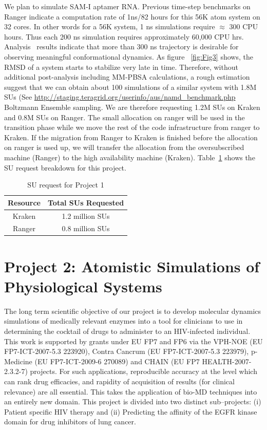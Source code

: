 \documentclass[a4paper,11pt]{article}
\newcommand{\up}{\vspace*{-1em}}
\begin{document}
We plan to simulate SAM-I aptamer RNA. Previous time-step benchmarks on Ranger indicate a computation rate of 1ns/82 hours for this 56K atom system on 32 cores. In other words for a 56K system, 1 ns simulations require $\approx$ 300 CPU hours.  Thus each 200 ns simulation requires approximately 60,000 CPU hrs.  Analysis~\cite{SAM-I-NAR2009} results indicate that more than 300 ns trajectory is desirable for observing meaningful conformational dynamics. As figure ~\ref{fig:Fig3} shows, the RMSD of a system starts to stabilize very late in time. Therefore, without additional post-analysis including MM-PBSA calculations, a rough estimation suggest that we can obtain about 100 simulations of a similar system with 1.8M SUs (See {\url{http://staging.teragrid.org/userinfo/aus/namd_benchmark.php}} Boltzmann Ensemble sampling. We are therefore requesting 1.2M SUs on Kraken and 0.8M SUs on Ranger. The small allocation on ranger will be used in the transition phase while we move the rest of the code infrastructure from ranger to Kraken. If the migration from Ranger to Kraken is finished before the allocation on ranger is used up, we will transfer the allocation from the oversubscribed machine (Ranger) to the high availability machine (Kraken). Table~\ref{table:project1} shows the SU request
breakdown for this project.

\begin{table}[!h]
\begin{center}
\begin{tabular}{|c|c| }
\hline 
Resource & Total SUs Requested \\ 
\hline
Kraken   & 1.2 million SUs \\
\hline
Ranger   & 0.8 million SUs \\
\hline
\end{tabular}
\end{center}
  \caption{SU request for Project 1}\label{table:project1}
\up
\end{table}



\section{Project 2: Atomistic Simulations of Physiological Systems}

The long term scientific objective of our project is to develop molecular dynamics simulations of 
medically relevant enzymes into a tool for clinicians to use in determining the cocktail of drugs to 
administer to an HIV-infected individual. This work is supported by grants under EU FP7 and FP6 
via the VPH-NOE (EU FP7-ICT-2007-5.3 223920), Contra Cancrum (EU FP7-ICT-2007-5.3 223979), 
p-Medicine (EU FP7-ICT-2009-6 270089) and CHAIN (EU FP7 HEALTH-2007-2.3.2-7) projects. For such 
applications, reproducible accuracy at the level which can rank drug efficacies, and rapidity 
of acquisition of results (for clinical relevance) are all essential. This takes the application 
of bio-MD techniques into an entirely new domain. This project is divided into two distinct sub--projects:
(i) Patient specific HIV therapy and (ii) Predicting the affinity of the EGFR kinase domain for drug inhibitors of lung cancer.
\end{document}
